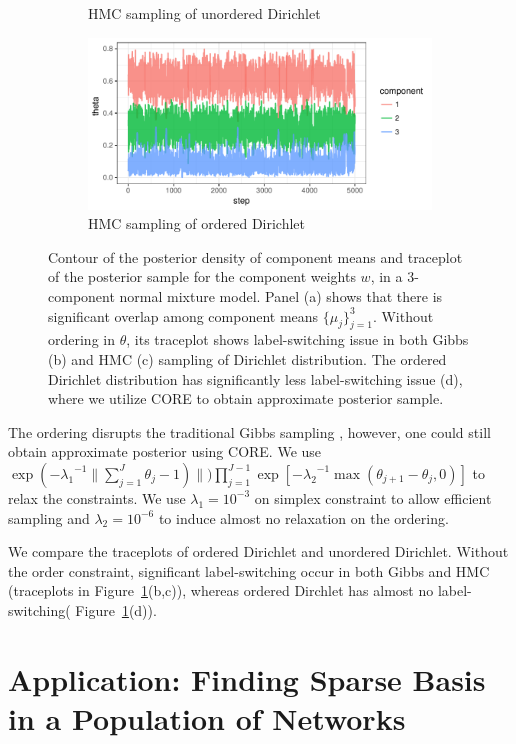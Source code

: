 \documentclass[10pt,fleqn]{article} \pdfoutput=1
\DeclareMathOperator{\1}{\mathbbm{1}} \DeclareMathOperator{\bigO}{\mc O}
\begin{document}
\begin{figure}[H]
\begin{subfigure}[b]{0.32\textwidth}
    \caption{\small  HMC sampling of unordered Dirichlet}
      \end{subfigure}
       \begin{subfigure}[b]{0.32\textwidth}
 \includegraphics[width=1\textwidth]{fmm_w_hmc.pdf}
     \caption{\small  HMC sampling of ordered Dirichlet}
     \end{subfigure}
\caption{Contour of the posterior density of component means and traceplot of the posterior sample for the component weights $w$, in a 3-component normal mixture model. Panel (a) shows that there is significant overlap among component means $\{\mu_j\}_{j=1}^3$. Without ordering in $\theta$, its traceplot shows label-switching issue in both Gibbs (b) and HMC  (c) sampling of Dirichlet distribution. The ordered Dirichlet distribution has significantly less label-switching issue (d), where we utilize CORE to obtain approximate posterior sample.}
\label{dirichlet}
\end{figure}


The ordering disrupts the traditional Gibbs sampling \citep{ishwaran2001gibbs}, however, one could still obtain approximate posterior using CORE. We use $
\exp ( -  {\lambda_1}^{-1} \| \sum_{j=1}^J  \theta_{j} - 1) \|)
\prod_{j=1}^{J-1} \exp [ -  {\lambda_2}^{-1}  \max( \theta_{j+1} - \theta_j,0)]  $ to relax the constraints. We use $\lambda_1 = 10^{-3}$ on simplex constraint to allow efficient sampling and $\lambda_2 = 10^{-6}$ to induce almost no relaxation on the ordering.

We compare the traceplots of ordered Dirichlet and unordered Dirichlet. Without the order constraint, significant label-switching occur in both Gibbs and HMC (traceplots in Figure~\ref{dirichlet}(b,c)), whereas ordered Dirchlet has almost no label-switching( Figure~\ref{dirichlet}(d)).

\section{Application: Finding Sparse Basis in a Population of Networks}
\end{document}
